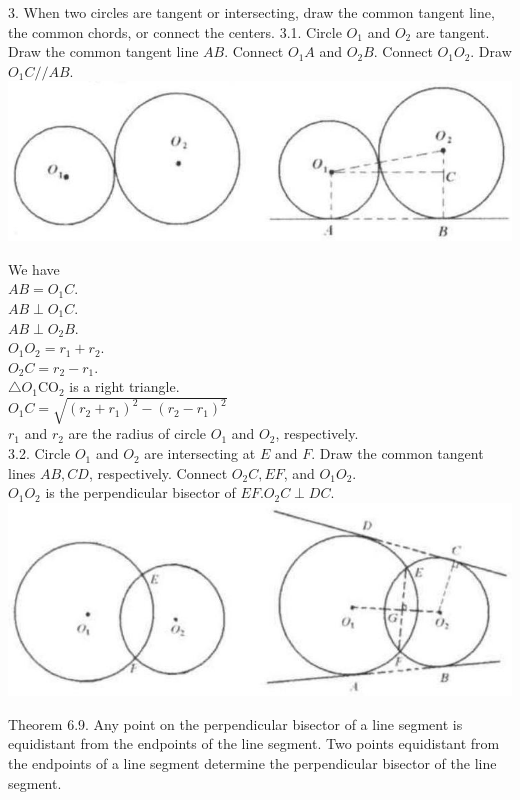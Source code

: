 \documentclass{article}
\begin{document}
3. When two circles are tangent or intersecting, draw the common tangent line, the common chords, or connect the centers.
3.1. Circle \(O_{1}\) and \(O_{2}\) are tangent. Draw the common tangent line \(A B\). Connect \(O_{1} A\) and \(O_{2} B\). Connect \(O_{1} O_{2}\). Draw \(O_{1} C / / A B\).\\
\centering
\includegraphics[width=\textwidth]{images/175(1).jpg}

We have\\
\(A B=O_{1} C\).\\
\(A B \perp O_{1} C\).\\
\(A B \perp O_{2} B\).\\
\(O_{1} O_{2}=r_{1}+r_{2}\).\\
\(O_{2} C=r_{2}-r_{1}\).\\
\(\triangle O_{1} \mathrm{CO}_{2}\) is a right triangle.\\
\(O_{1} C=\sqrt{\left(r_{2}+r_{1}\right)^{2}-\left(r_{2}-r_{1}\right)^{2}}\)\\
\(r_{1}\) and \(r_{2}\) are the radius of circle \(O_{1}\) and \(O_{2}\), respectively.\\
3.2. Circle \(O_{1}\) and \(O_{2}\) are intersecting at \(E\) and \(F\). Draw the common tangent lines \(A B, C D\), respectively. Connect \(O_{2} C, E F\), and \(O_{1} O_{2}\).\\
\(O_{1} O_{2}\) is the perpendicular bisector of \(E F . O_{2} C \perp D C\).\\
\centering
\includegraphics[width=\textwidth]{images/175.jpg}

Theorem 6.9. Any point on the perpendicular bisector of a line segment is equidistant from the endpoints of the line segment. Two points equidistant from the endpoints of a line segment determine the perpendicular bisector of the line segment.
\end{document}
